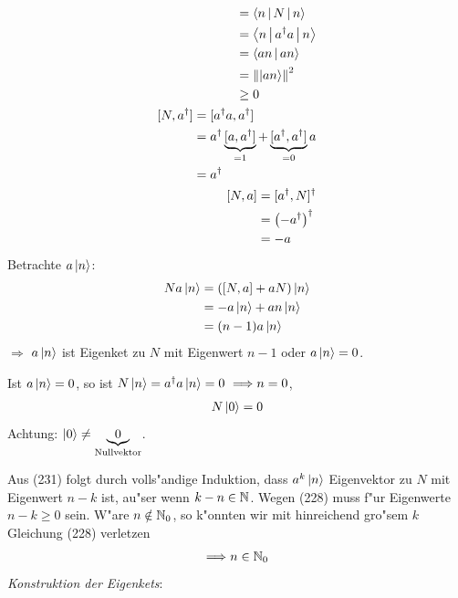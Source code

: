 \documentclass[a4paper]{scrartcl}
\newcommand{\NN}{\ensuremath \mathbb{N}}
\begin{document}
{\begin{align}
\begin{split}
& = \Braket { n | N | n } \\
& = \Braket{ n | a^\dagger a | n } \\
& = \Braket {an | an} \\
& = \left\Vert \ket{an} \right\Vert^2 \\
& \geq 0 
\end{split} \\
\begin{split}
[N, a^\dagger] & = [a^\dagger a, a^\dagger] \\
& = a^\dagger \underbrace{ [a, a^\dagger] }_{=1} + \underbrace{ [a^\dagger, a^\dagger]}_{=0} a \\
& = a^\dagger
\end{split} \\
\begin{split}
[N, a] & = [a^\dagger, N]^\dagger \\
& = \left( -a^\dagger \right)^\dagger \\
& = -a
\end{split}
\end{align}
Betrachte $a \ket n$:
\begin{align}
\begin{split}
N a \ket n & = \left( [N, a] + aN \right) \ket n \\
& = - a \ket n + an \ket n \\
& = (n-1) a \ket n 
\end{split}
\end{align}
$\Longrightarrow$ $a \ket n $ ist Eigenket zu $N$ mit Eigenwert $n-1$ oder $a \ket n = 0$.

Ist $a \ket n = 0$, so ist $N \ket n = a^\dagger a \ket n =  0 \ \Longrightarrow n = 0$,
\begin{align}
N \ket 0 = 0
\end{align}
Achtung: $\ket 0 \neq \underbrace{0}_{\mathrm{Nullvektor}}$.

Aus (231) folgt durch volls"andige Induktion, dass $a^k \ket n$ Eigenvektor zu $N$ mit Eigenwert $n-k$ ist, au"ser wenn $k-n \in \NN$. Wegen (228) muss f"ur Eigenwerte $n-k \geq 0$ sein. W"are $n \notin \NN_0$, so k"onnten wir mit hinreichend gro"sem $k$ Gleichung (228) verletzen 
\begin{align}
\Longrightarrow n \in \NN_0
\end{align}
\emph{Konstruktion der Eigenkets}: 

}
\end{document}
